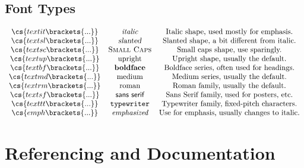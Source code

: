 \documentclass[12pt,hidelinks]{article}
\begin{document}
	\subsection{Font Types}
\[\begin{array}{ccc}
\cs{textit\brackets{...}} & \textit{italic} & \textup{Italic shape, used mostly for emphasis.}\\
\cs{textsl\brackets{...}} & \textsl{slanted} & \textup{Slanted shape, a bit different from italic.}\\
\cs{textsc\brackets{...}} & \textsc{Small Caps} & \textup{Small caps shape, use sparingly.}\\
\cs{textup\brackets{...}} & \textup{upright} & \textup{Upright shape, usually the default.}\\
\cs{textbf\brackets{...}} & \textbf{boldface} & \textup{Boldface series, often used for headings.}\\
\cs{textmd\brackets{...}} & \textmd{medium} & \textup{Medium series, usually the default.}\\
\cs{textrm\brackets{...}} & \textrm{roman} & \textup{Roman family, usually the default.}\\
\cs{textsf\brackets{...}} & \textsf{sans serif} & \textup{Sans Serif family, used for posters, etc.}\\
\cs{texttt\brackets{...}} & \texttt{typewriter} & \textup{Typewriter family, fixed-pitch characters.}\\
\cs{emph\brackets{...}} & \emph{emphasized} & \textup{Use for emphasis, usually changes to italic.}\\		
\end{array}\]
\newpage
{}
\section{Referencing and Documentation}
\vspace{10.5cm}
\end{document}
